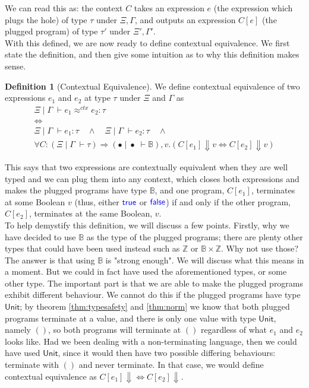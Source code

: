 \documentclass[a4paper, 11pt]{report}
\theoremstyle{definition}
\newtheorem{definition}{Definition}[section]
\newcommand{\Keyword}[1]{{\color{blue} \mathsf{#1}}}
\newcommand{\expr}{e}
\newcommand{\val}{v}
\newcommand{\TT}{()}
\newcommand{\True}{\Keyword{true}}
\newcommand{\False}{\Keyword{false}}
\newcommand{\ctx}{C}
\newcommand{\Tunit}{\mathsf{Unit}}
\newcommand{\Tint}{\mathbb{Z}}
\newcommand{\Tbool}{\mathbb{B}}
\newcommand{\Tprod}[2]{#1 \times #2}
\newcommand{\typ}{\tau}
\newcommand{\venv}{\Gamma}
\newcommand{\tenv}{\Xi}
\newcommand{\emptenv}{\bullet}
\newcommand{\empvenv}{\bullet}
\newcommand{\jdg}[4]{#1 \; | \; #2 \; \vdash #3 : #4}
\newcommand{\jdgType}[3]{#1 \; | \; #2 \; \vdash #3}
\newcommand{\jdgRel}[6]{#1 \; | \; #2 \; \vdash #3 \approx^{#4} #5 : #6}
\newcommand{\ctxRel}[5]{\jdgRel{#1}{#2}{#3}{ctx}{#4}{#5}}
\begin{document}
We can read this as: the context $\ctx$ takes an expression $\expr$ (the expression which plugs the hole) of type $\typ$ under $\tenv, \venv$, and outputs an expression $\ctx[\expr]$ (the plugged program) of type $\typ'$ under $\tenv', \venv'$.\\
With this defined, we are now ready to define contextual equivalence. We first state the definition, and then give some intuition as to why this definition makes sense. 
\begin{definition}[Contextual Equivalence]\label{def:CE}
  We define contextual equivalence of two expressions $\expr_1$ and $\expr_2$ at type $\typ$ under $\tenv$ and $\venv$ as
  \begin{equation*}
    \begin{gathered}
      \ctxRel{\tenv}{\venv}{\expr_1}{\expr_2}{\typ}\\
      \iff\\
      \jdg{\tenv}{\venv}{\expr_1}{\typ} \quad \land \quad
      \jdg{\tenv}{\venv}{\expr_2}{\typ} \quad \land \quad\\
      \forall \ctx : (\jdgType{\tenv}{\venv}{\typ}) \Rightarrow (\jdgType{\emptenv}{\empvenv}{\Tbool}), \val . (\ctx[\expr_1] \Downarrow \val \iff \ctx[\expr_2] \Downarrow \val)
    \end{gathered}
  \end{equation*}
\end{definition}
This says that two expressions are contextually equivalent when they are well typed and we can plug them into any context, which closes both expressions and makes the plugged programs have type $\Tbool$, and one program, $\ctx[\expr_1]$, terminates at some Boolean $\val$ (thus, either $\True$ or $\False$) if and only if the other program, $\ctx[\expr_2]$, terminates at the same Boolean, $\val$.\\
To help demystify this definition, we will discuss a few points. Firstly, why we have decided to use $\Tbool$ as the type of the plugged programs; there are plenty other types that could have been used instead such as $\Tint$ or $\Tprod{\Tbool}{\Tint}$. Why not use those? The answer is that using $\Tbool$ is "strong enough". We will discuss what this means in a moment. But we could in fact have used the aforementioned types, or some other type. The important part is that we are able to make the plugged programs exhibit different behaviour. We cannot do this if the plugged programs have type $\Tunit$; by theorem \ref{thm:typesafety} and \ref{thm:norm} we know that both plugged programs terminate at a value, and there is only one value with type $\Tunit$, namely $\TT$, so both programs will terminate at $\TT$ regardless of what $\expr_1$ and $\expr_2$ looks like. Had we been dealing with a non-terminating language, then we could have used $\Tunit$, since it would then have two possible differing behaviours: terminate with $\TT$ and never terminate. In that case, we would define contextual equivalence as $\ctx[\expr_1] \Downarrow \iff \ctx[\expr_2] \Downarrow$.
\end{document}
